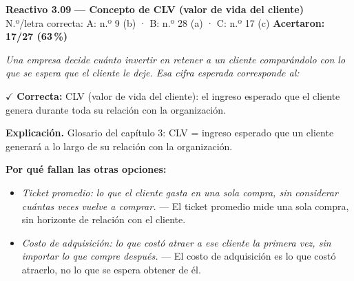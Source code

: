 \documentclass[10pt,letterpaper]{article}
\begin{document}
\begin{minipage}{\textwidth}
{\color{guinda}\textbf{Reactivo 3.09}} \textbf{— Concepto de CLV (valor de vida del cliente)}\\[-1pt]
{\scriptsize N.º/letra correcta: A: n.º 9 (b) · B: n.º 28 (a) · C: n.º 17 (c) \hfill \textbf{Acertaron: 17/27 (63\,\%)}}

\textit{Una empresa decide cuánto invertir en retener a un cliente comparándolo con lo que se espera que el cliente le deje. Esa cifra esperada corresponde al:}

\textcolor{verde}{$\checkmark$} \textbf{Correcta:} CLV (valor de vida del cliente): el ingreso esperado que el cliente genera durante toda su relación con la organización.

\textbf{Explicación.} Glosario del capítulo 3: CLV = ingreso esperado que un cliente generará a lo largo de su relación con la organización.

\textbf{Por qué fallan las otras opciones:}
\begin{itemize}[itemsep=0pt,topsep=1pt,leftmargin=1.3em,parsep=0pt]
\item[\textcolor{rojo}{$\times$}] \textit{Ticket promedio: lo que el cliente gasta en una sola compra, sin considerar cuántas veces vuelve a comprar.} --- El ticket promedio mide una sola compra, sin horizonte de relación con el cliente.
\item[\textcolor{rojo}{$\times$}] \textit{Costo de adquisición: lo que costó atraer a ese cliente la primera vez, sin importar lo que compre después.} --- El costo de adquisición es lo que costó atraerlo, no lo que se espera obtener de él.
\end{itemize}
\end{minipage}\par\vspace{5pt}{\color{gray!40}\hrule}\vspace{5pt}
\end{document}
